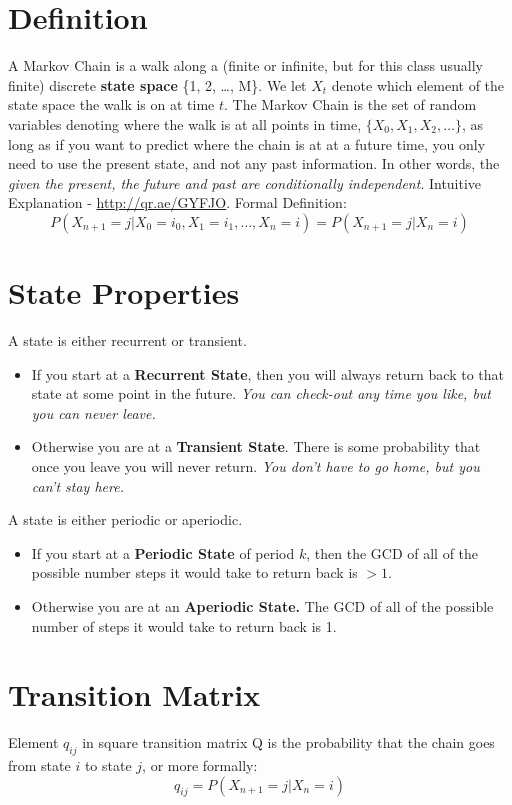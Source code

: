 \documentclass[11pt]{article}
\begin{document}
{\section*{Definition}
A Markov Chain is a walk along a (finite or infinite, but for this class usually finite) discrete \textbf{state space} \{1, 2, \dots, M\}. We let $X_t$ denote which element of the state space the walk is on at time $t$. The Markov Chain is the set of random variables denoting where the walk is at all points in time, $\{X_0, X_1, X_2, \dots \}$, as long as if you want to predict where the chain is at at a future time, you only need to use the present state, and not any past information. In other words, the \emph{given the present, the future and past are conditionally independent}. Intuitive Explanation - \url{http://qr.ae/GYFJO}. Formal Definition:
\[P(X_{n+1} = j | X_0 = i_0, X_1 = i_1, \dots, X_n = i) = P(X_{n+1} = j | X_n = i)\]
\section*{State Properties}
A state is either recurrent or transient.
\begin{itemize}
\item If you start at a \textbf{Recurrent State}, then you will always return back to that state at some point in the future.  \textmusicalnote \emph{You can check-out any time you like, but you can never leave.}  \textmusicalnote
\item Otherwise you are at a \textbf{Transient State}. There is some probability that once you leave you will never return. \textmusicalnote \emph{You don't have to go home, but you can't stay here.} \textmusicalnote
\end{itemize}
A state is either periodic or aperiodic.
\begin{itemize}
\item If you start at a \textbf{Periodic State} of period $k$, then the GCD of all of the possible number steps it would take to return back is  $> 1$.
\item Otherwise you are at an \textbf{Aperiodic State.} The GCD of all of the possible number of steps it would take to return back is 1.
\end{itemize}


\section*{Transition Matrix}
Element $q_{ij}$ in square transition matrix Q is the probability that the chain goes from state $i$ to state $j$, or more formally:
\[q_{ij} = P(X_{n+1} = j | X_n = i)\]

}
\end{document}

